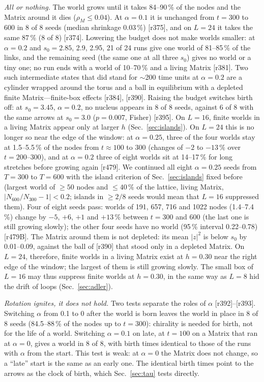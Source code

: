 \documentclass[reprint,pre,amsmath,amssymb,superscriptaddress,nofootinbib]{revtex4-2}
\newcommand{\sz}{s_0}
\begin{document}
\emph{All or nothing.} The world grows until it takes 84--90\,\% of the nodes and the Matrix around it dies ($\rho_M\le0.04$). At $\alpha=0.1$ it is unchanged from $t=300$ to 600 in 8 of 8 seeds (median shrinkage 0.03\,\%) [r375], and on $L=24$ it takes the same 87\,\% (8 of 8) [r374]. Lowering the budget does not make worlds smaller: at $\alpha=0.2$ and $\sz=2.85$, 2.9, 2.95, 21 of 24 runs give one world of 81--85\,\% of the links, and the remaining seed (the same one at all three $\sz$) gives no world or a tiny one; no run ends with a world of 10--70\,\% and a living Matrix [r381]. Two such intermediate states that did stand for $\sim$200 time units at $\alpha=0.2$ are a cylinder wrapped around the torus and a ball in equilibrium with a depleted finite Matrix---finite-box effects [r384], [r390]. Raising the budget switches birth off: at $\sz=3.45$, $\alpha=0.2$, no nucleus appears in 8 of 8 seeds, against 6 of 8 with the same arrows at $\sz=3.0$ ($p=0.007$, Fisher) [r395]. On $L=16$, finite worlds in a living Matrix appear only at larger $h$ (Sec.~\ref{sec:islands}). On $L=24$ this is no longer so near the edge of the window: at $\alpha=0.25$, three of the four worlds stay at 1.5--5.5\,\% of the nodes from $t\approx100$ to 300 (changes of $-2$ to $-13\,\%$ over $t=200$--300), and at $\alpha=0.2$ three of eight worlds sit at 14--17\,\% for long stretches before growing again [r479]. We continued all eight $\alpha=0.25$ seeds from $T=300$ to $T=600$ with the island criterion of Sec.~\ref{sec:islands} fixed before (largest world of $\ge50$ nodes and $\le40\,\%$ of the lattice, living Matrix, $|N_{600}/N_{300}-1|<0.2$; islands in $\ge2/8$ seeds would mean that $L=16$ suppressed them). Four of eight seeds pass: worlds of 191, 657, 716 and 1022 nodes (1.4--7.4\,\%) change by $-5$, $+6$, $+1$ and $+13\,\%$ between $t=300$ and 600 (the last one is still growing slowly); the other four seeds have no world (95\,\% interval 0.22--0.78) [r479B]. The Matrix around them is not depleted: its mean $|z|^2$ is below $\sz$ by 0.01--0.09, against the ball of [r390] that stood only in a depleted Matrix. On $L=24$, therefore, finite worlds in a living Matrix exist at $h=0.30$ near the right edge of the window; the largest of them is still growing slowly. The small box of $L=16$ may thus suppress finite worlds at $h=0.30$, in the same way as $L=8$ hid the drift of loops (Sec.~\ref{sec:adler}).

\emph{Rotation ignites, it does not hold.} Two tests separate the roles of $\alpha$ [r392]--[r393]. Switching $\alpha$ from 0.1 to 0 after the world is born leaves the world in place in 8 of 8 seeds (84.5--88\,\% of the nodes up to $t=300$): chirality is needed for birth, not for the life of a world. Switching $\alpha=0.1$ on late, at $t=100$ on a Matrix that ran at $\alpha=0$, gives a world in 8 of 8, with birth times identical to those of the runs with $\alpha$ from the start. This test is weak: at $\alpha=0$ the Matrix does not change, so a ``late'' start is the same as an early one. The identical birth times point to the arrows as the clock of birth, which Sec.~\ref{sec:tau} tests directly.
\end{document}
